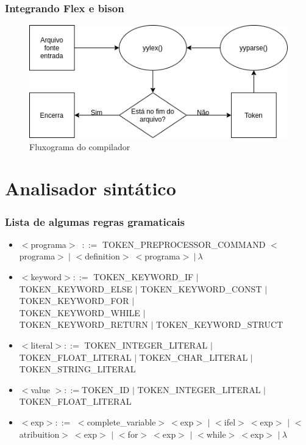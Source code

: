 \documentclass[12pt]{beamer}
\begin{document}
\begin{frame}
    \frametitle{Integrando Flex e bison}
    \begin{figure}[!htb]
        \centering
        \includegraphics[width=\textwidth]{fluxo}
        \caption{\label{fig:fluxo}Fluxograma do compilador}
    \end{figure}
\end{frame}

\section[Analisador sintático]{Analisador sintático}\label{Analisádor sintático}
\begin{frame}[allowframebreaks]
    \frametitle{Lista de algumas regras gramaticais}
    \begin{itemize}
        \item $<$programa$>$~$::=$ TOKEN\_PREPROCESSOR\_COMMAND $<$programa$>~|$ $<$definition$>~<$programa$>~|~\lambda$
        \item $<$keyword$>::=$ TOKEN\_KEYWORD\_IF $|$ TOKEN\_KEYWORD\_ELSE $|$ TOKEN\_KEYWORD\_CONST $|$\\TOKEN\_KEYWORD\_FOR $|$\\TOKEN\_KEYWORD\_WHILE $|$\\TOKEN\_KEYWORD\_RETURN $|$ TOKEN\_KEYWORD\_STRUCT
        \framebreak
        \item $<$literal$>::=$ TOKEN\_INTEGER\_LITERAL $|$ TOKEN\_FLOAT\_LITERAL $|$ TOKEN\_CHAR\_LITERAL $|$ TOKEN\_STRING\_LITERAL
        \item $<$value $>::=$TOKEN\_ID $|$ TOKEN\_INTEGER\_LITERAL $|$ TOKEN\_FLOAT\_LITERAL
        \item $<$exp$> ::= $ $<$complete\_variable$>~<$exp$>$ $|$ $<$ifel$>~<$exp$>$ $|$ $<$atribuition$>~<$exp$>$ $|$ $<$for$>~<$exp$>$ $|$ $<$while$>~<$exp$>$ $|~\lambda$
    \end{itemize}
\end{frame}
\end{document}
